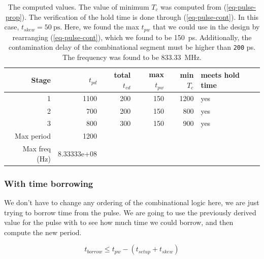 \documentclass[hidelinks, 12pt]{article}
\begin{document}
\begin{table}[htbp]
\caption{\label{tab-q2-1}The computed values. The value of minimum \(T_{c}\) was computed from (\ref{eq-pulse-prop}). The verification of the hold time is done through (\ref{eq-pulse-cont}). In this case, \(t_{skew}=\qty{50}{\pico\s}\). Here, we found the max \(t_{pw}\) that we could use in the design by rearranging (\ref{eq-pulse-cont}), which we found to be \qty{150}{\pico\s}. Additionally, the contamination delay of the combinational segment must be higher than \texttt{200} \unit{\pico\s}. The frequency was found to be \qty{833.33}{\mega\hertz}.}
\centering
\begin{tabular}{rrrrrl}
Stage & \(t_{pd}\) & total \(t_{cd}\) & max \(t_{pw}\) & min \(T_{c}\) & meets hold time\\
\hline
1 & 1100 & 200 & 150 & 1200 & yes\\
2 & 700 & 200 & 150 & 800 & yes\\
3 & 800 & 300 & 150 & 900 & yes\\
\hline
Max period & 1200 &  &  &  & \\
Max freq (\unit{\hertz}) & 8.33333e+08 &  &  &  & \\
\end{tabular}
\end{table}
\subsubsection*{With time borrowing}
\label{sec:orgc162f49}
We don't have to change any ordering of the combinational logic here, we are just trying to borrow time from the pulse.
We are going to use the previously derived value for the pulse with to see how much time we could borrow, and then compute the new period.

\begin{equation}
\label{eq-pulse-borrow}
t_{borrow} \leq t_{pw} - \left( t_{setup} + t_{skew} \right)
\end{equation}
\end{document}
